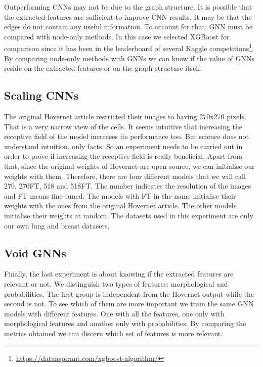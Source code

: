Outperforming CNNs may not be due to the graph structure. It is possible that the extracted features are sufficient to improve CNN results. It may be that the edges do not contain any useful information. To account for that, GNN must be compared with node-only methods. In this case we selected XGBoost \cite{xgboost} for comparison since it has been in the leaderboard of several Kaggle competitions\footnote{\url{https://dataaspirant.com/xgboost-algorithm/}}. By comparing node-only methods with GNNs we can know if the value of GNNs reside on the extracted features or on the graph structure itself.

\subsection{Scaling CNNs}

The original Hovernet article restricted their images to having 270x270 pixels. That is a very narrow view of the cells. It seems intuitive that increasing the receptive field of the model increases its performance too. But science does not understand intuition, only facts. So an experiment needs to be carried out in order to prove if increasing the receptive field is really beneficial. Apart from that, since the original weights of Hovernet are open source, we can initialise our weights with them. Therefore, there are four different models that we will call 270, 270FT, 518 and 518FT. The number indicates the resolution of the images and FT means fine-tuned. The models with FT in the name initialise their weights with the ones from the original Hovernet article. The other models initialise their weights at random. The datasets used in this experiment are only our own lung and breast datasets.

\subsection{Void GNNs}

Finally, the last experiment is about knowing if the extracted features are relevant or not. We distinguish two types of features: morphological and probabilities. The first group is independent from the Hovernet output while the second is not. To see which of them are more important we train the same GNN models with different features. One with all the features, one only with morphological features and another only with probabilities. By comparing the metrics obtained we can discern which set of features is more relevant.


